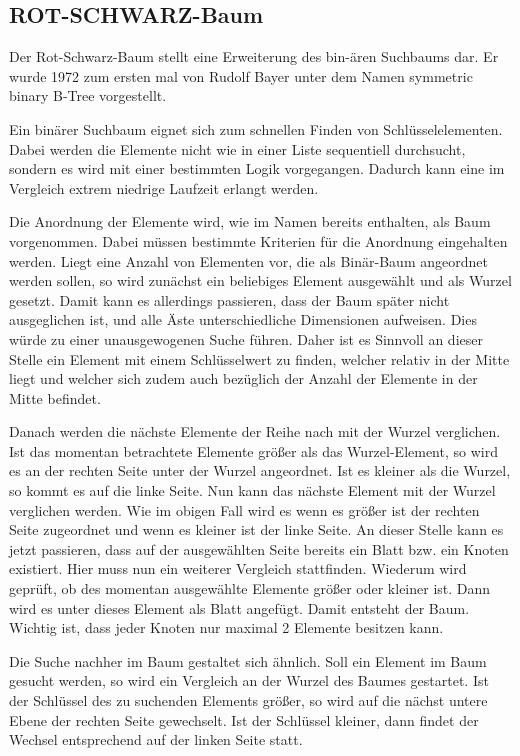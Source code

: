\subsection{ROT-SCHWARZ-Baum}
Der Rot-Schwarz-Baum stellt eine Erweiterung des bin-ären Suchbaums dar. Er wurde 1972 zum ersten mal von Rudolf Bayer unter dem Namen \glqq symmetric binary B-Tree\grqq{} vorgestellt.

Ein binärer Suchbaum eignet sich zum schnellen Finden von Schlüsselelementen. Dabei werden die Elemente nicht wie in einer Liste sequentiell durchsucht, sondern es wird mit einer bestimmten Logik vorgegangen.
Dadurch kann eine im Vergleich extrem niedrige Laufzeit erlangt werden. 

Die Anordnung der Elemente wird, wie im Namen bereits enthalten, als Baum vorgenommen. Dabei müssen bestimmte Kriterien für die Anordnung eingehalten werden. Liegt eine Anzahl von Elementen vor, die als Binär-Baum angeordnet werden sollen, so wird zunächst ein beliebiges Element ausgewählt und als Wurzel gesetzt. Damit kann es allerdings passieren, dass der Baum später nicht ausgeglichen ist, und alle Äste unterschiedliche Dimensionen aufweisen. Dies würde zu einer unausgewogenen Suche führen. Daher ist es Sinnvoll an dieser Stelle ein Element mit einem Schlüsselwert zu finden, welcher relativ in der Mitte liegt und welcher sich zudem auch bezüglich der Anzahl der Elemente in der Mitte befindet.

Danach werden die nächste Elemente der Reihe nach mit der Wurzel verglichen. Ist das momentan betrachtete Elemente größer als das Wurzel-Element, so wird es an der rechten Seite unter der Wurzel angeordnet. Ist es kleiner als die Wurzel, so kommt es auf die linke Seite. Nun kann das nächste Element mit der Wurzel verglichen werden. Wie im obigen Fall wird es wenn es größer ist der rechten Seite zugeordnet und wenn es kleiner ist der linke Seite. An dieser Stelle kann es jetzt passieren, dass auf der ausgewählten Seite bereits ein Blatt bzw. ein Knoten existiert. Hier muss nun ein weiterer Vergleich stattfinden. Wiederum wird geprüft, ob des momentan ausgewählte Elemente größer oder kleiner ist. Dann wird es unter dieses Element als Blatt angefügt. Damit entsteht der Baum. Wichtig ist, dass jeder Knoten nur maximal 2 Elemente besitzen kann. 

Die Suche nachher im Baum gestaltet sich ähnlich. Soll ein Element im Baum gesucht werden, so wird ein Vergleich an der Wurzel des Baumes gestartet. Ist der Schlüssel des zu suchenden Elements größer, so wird auf die nächst untere Ebene der rechten Seite gewechselt. Ist der Schlüssel kleiner, dann findet der Wechsel entsprechend auf der linken Seite statt. 

